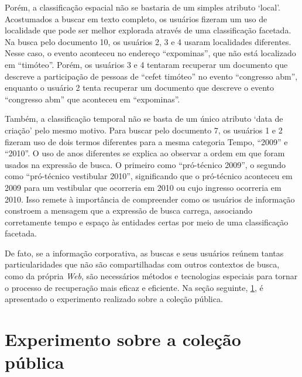Porém, a classificação espacial não se bastaria de um simples atributo `local'. Acostumados a buscar em texto completo, os usuários fizeram um uso de localidade que pode ser melhor explorada através de uma classificação facetada. Na busca pelo documento 10, os usuários 2, 3 e 4 usaram localidades diferentes. Nesse caso, o evento aconteceu no endereço ``expominas'', que não está localizado em ``timóteo''. Porém, os usuários 3 e 4 tentaram recuperar um documento que descreve a participação de pessoas de ``cefet timóteo'' no evento ``congresso abm'', enquanto o usuário 2 tenta recuperar um documento que descreve o evento ``congresso abm'' que aconteceu em ``expominas''.

Também, a classificação temporal não se basta de um único atributo `data de criação' pelo mesmo motivo. Para buscar pelo documento 7, os usuários 1 e 2 fizeram uso de dois termos diferentes para a mesma categoria Tempo, ``2009'' e ``2010''. O uso de anos diferentes se explica ao observar a ordem em que foram usados na expressão de busca. O primeiro como ``pró-técnico 2009'', o segundo como ``pró-técnico vestibular 2010'', significando que o pró-técnico aconteceu em 2009 para um vestibular que ocorreria em 2010 ou cujo ingresso ocorreria em 2010. Isso remete à importância de compreender como os usuários de informação constroem a mensagem que a expressão de busca carrega, associando corretamente tempo e espaço às entidades certas por meio de uma classificação facetada.

De fato, se a informação corporativa, as buscas e seus usuários reúnem tantas particularidades que não são compartilhadas com outros contextos de busca, como da própria \textit{Web}, são necessários métodos e tecnologias especiais para tornar o processo de recuperação mais eficaz e eficiente. Na seção seguinte, \ref{prototipo-colecaoPublica}, é apresentado o experimento realizado sobre a coleção pública.











\section{Experimento sobre a coleção pública}
\label{prototipo-colecaoPublica}

